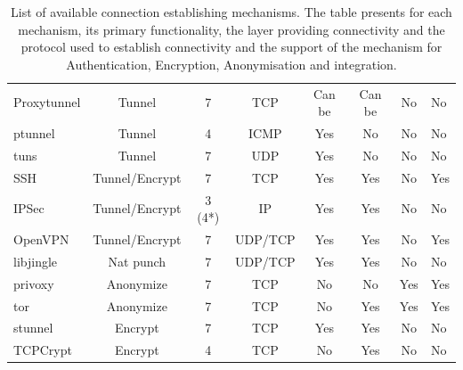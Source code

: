 \begin{table}
\begin{tabular}{|l|c|c|c|c|c|c|p{1.5cm}| }
Proxytunnel & Tunnel            & 7      & TCP         & Can be & Can be & No & No\\
ptunnel     & Tunnel            & 4      & ICMP        & Yes    & No     & No & No\\
tuns        & Tunnel            & 7      & UDP         & Yes    & No     & No & No\\
SSH         & Tunnel/Encrypt & 7      & TCP         & Yes    & Yes    & No & Yes\\
IPSec       & Tunnel/Encrypt & 3 (4*) & IP          & Yes    & Yes    & No & No\\
OpenVPN     & Tunnel/Encrypt & 7      & UDP/TCP     & Yes    & Yes    & No & Yes\\
libjingle   & Nat punch         & 7      & UDP/TCP     & Yes    & Yes & No & No\\
privoxy     & Anonymize         & 7      & TCP         & No    & No   & Yes & Yes\\
tor         & Anonymize         & 7      & TCP         & No     & Yes & Yes & Yes\\
stunnel     & Encrypt        & 7      & TCP         & Yes    & Yes    & No & No\\
TCPCrypt    & Encrypt        & 4      & TCP         & No     & Yes    & No & No\\
\hline
\end{tabular}
\caption[List of available connection establishing
mechanisms.]{\label{tbl:signpost-tunnels}List of available connection
  establishing mechanisms. The table presents for each mechanism, its primary
  functionality, the layer providing connectivity and the protocol used to
  establish connectivity and the support of the mechanism for Authentication,
  Encryption, Anonymisation and \signpost integration.}
\end{table}

